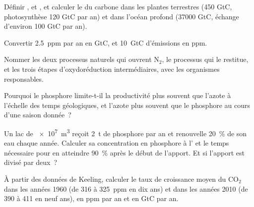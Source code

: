 \begin{exercise}[$\star$]\label{exo:b2:biogeochemical-cycles:1}
Définir ,  et , et calculer le  du carbone dans les plantes terrestres (450 GtC, photosynthèse
120 GtC par an) et dans l'océan profond (\num{37000} GtC, échange
d'environ 100 GtC par an).
\end{exercise}

\begin{exercise}[$\star$]\label{exo:b2:biogeochemical-cycles:2}
Convertir \qty{2.5}{ppm} par an en GtC, et \qty{10}{GtC} d'émissions en
ppm.
\end{exercise}

\begin{exercise}[$\star$]\label{exo:b2:biogeochemical-cycles:3}
Nommer les deux processus naturels qui ouvrent $\mathrm{N_2}$, le processus
qui le restitue, et les trois étapes d'oxydoréduction intermédiaires,
avec les organismes responsables.
\end{exercise}

\begin{exercise}[$\star$]\label{exo:b2:biogeochemical-cycles:4}
Pourquoi le phosphore limite-t-il la productivité plus souvent que l'azote
à l'échelle des temps géologiques, et l'azote plus souvent que le
phosphore au cours d'une saison donnée~?
\end{exercise}

\begin{exercise}[$\star\star$]\label{exo:b2:biogeochemical-cycles:5}
Un lac de \qty{e7}{m^3} reçoit \qty{2}{t} de phosphore par an et
renouvelle \qty{20}{\%} de son eau chaque année. Calculer sa concentration
en phosphore à l' et le temps nécessaire pour en
atteindre \qty{90}{\%} après le début de l'apport. Et si l'apport est
divisé par deux~?
\end{exercise}

\begin{exercise}[$\star\star$]\label{exo:b2:biogeochemical-cycles:6}
À partir des données de Keeling, calculer le taux de croissance moyen du
$\mathrm{CO_2}$ dans les années 1960 (de 316 à \qty{325}{ppm} en dix ans) et
dans les années 2010 (de 390 à 411 en neuf ans), en ppm par an et en GtC
par an.
\end{exercise}

